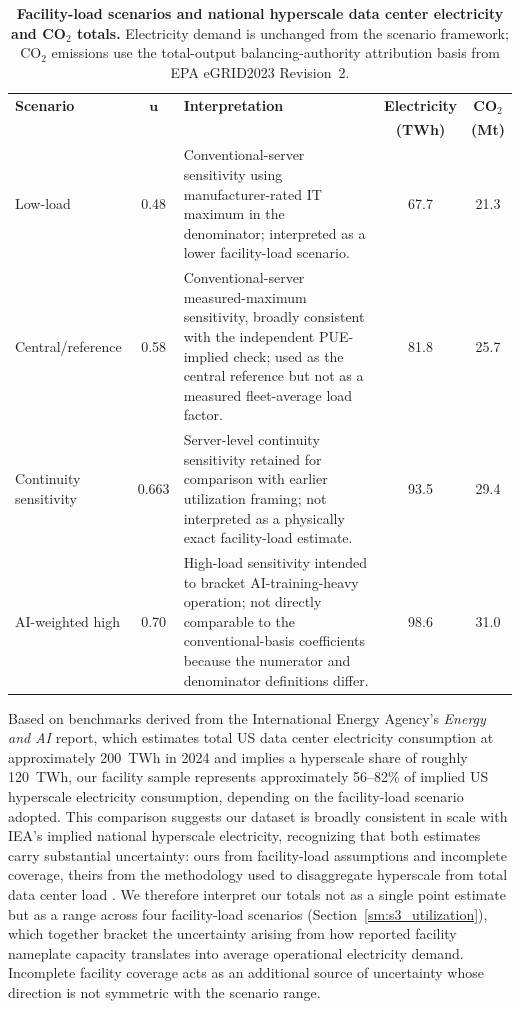 \documentclass[12pt]{article}
\begin{document}
\begin{table}[htbp]
\centering
\small
\setlength{\tabcolsep}{4pt}
\renewcommand{\arraystretch}{1.15}
\caption{\textbf{Facility-load scenarios and national hyperscale data center electricity and CO$_2$ totals.} Electricity demand is unchanged from the scenario framework; CO$_2$ emissions use the total-output balancing-authority attribution basis from EPA eGRID2023 Revision~2.}
\label{tab:scenario_table_main}
\begin{tabularx}{\textwidth}{l c X c c}
\toprule
\textbf{Scenario} & $\boldsymbol{u}$ & \textbf{Interpretation} & \textbf{Electricity} & \textbf{CO$_2$} \\
 & & & \textbf{(TWh)} & \textbf{(Mt)} \\
\midrule
Low-load & 0.48 & Conventional-server sensitivity using manufacturer-rated IT maximum in the denominator; interpreted as a lower facility-load scenario. & 67.7 & 21.3 \\
Central/reference & 0.58 & Conventional-server measured-maximum sensitivity, broadly consistent with the independent PUE-implied check; used as the central reference but not as a measured fleet-average load factor. & 81.8 & 25.7 \\
Continuity sensitivity & 0.663 & Server-level continuity sensitivity retained for comparison with earlier utilization framing; not interpreted as a physically exact facility-load estimate. & 93.5 & 29.4 \\
AI-weighted high & 0.70 & High-load sensitivity intended to bracket AI-training-heavy operation; not directly comparable to the conventional-basis coefficients because the numerator and denominator definitions differ. & 98.6 & 31.0 \\
\bottomrule
\end{tabularx}
\end{table}

Based on benchmarks derived from the International Energy Agency's \emph{Energy and AI} report, which estimates total US data center electricity consumption at approximately 200~TWh in 2024 and implies a hyperscale share of roughly 120~TWh, our facility sample represents approximately 56--82\% of implied US hyperscale electricity consumption, depending on the facility-load scenario adopted. This comparison suggests our dataset is broadly consistent in scale with IEA's implied national hyperscale electricity, recognizing that both estimates carry substantial uncertainty: ours from facility-load assumptions and incomplete coverage, theirs from the methodology used to disaggregate hyperscale from total data center load \cite{iea2025energyai}. We therefore interpret our totals not as a single point estimate but as a range across four facility-load scenarios (Section~\ref{sm:s3_utilization}), which together bracket the uncertainty arising from how reported facility nameplate capacity translates into average operational electricity demand. Incomplete facility coverage acts as an additional source of uncertainty whose direction is not symmetric with the scenario range.
 
\end{document}
